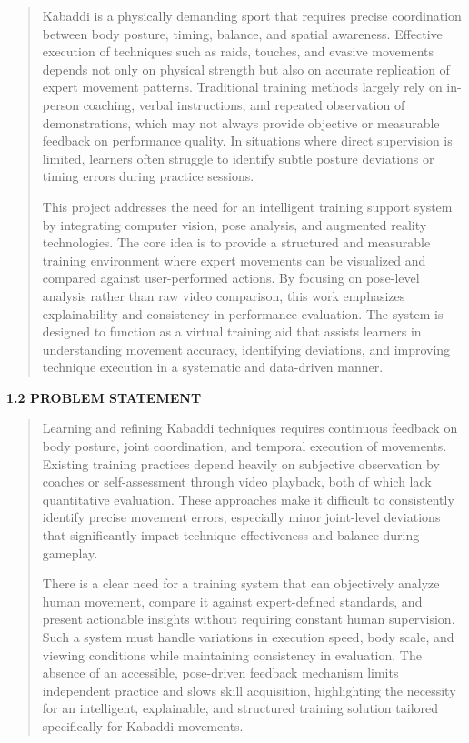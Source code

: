\documentclass[
]{article}
\begin{document}
\begin{quote}
Kabaddi is a physically demanding sport that requires precise
coordination between body posture, timing, balance, and spatial
awareness. Effective execution of techniques such as raids, touches, and
evasive movements depends not only on physical strength but also on
accurate replication of expert movement patterns. Traditional training
methods largely rely on in-person coaching, verbal instructions, and
repeated observation of demonstrations, which may not always provide
objective or measurable feedback on performance quality. In situations
where direct supervision is limited, learners often struggle to identify
subtle posture deviations or timing errors during practice sessions.

This project addresses the need for an intelligent training support
system by integrating computer vision, pose analysis, and augmented
reality technologies. The core idea is to provide a structured and
measurable training environment where expert movements can be visualized
and compared against user-performed actions. By focusing on pose-level
analysis rather than raw video comparison, this work emphasizes
explainability and consistency in performance evaluation. The system is
designed to function as a virtual training aid that assists learners in
understanding movement accuracy, identifying deviations, and improving
technique execution in a systematic and data-driven manner.
\end{quote}

\textbf{1.2 PROBLEM STATEMENT}

\begin{quote}
Learning and refining Kabaddi techniques requires continuous feedback on
body posture, joint coordination, and temporal execution of movements.
Existing training practices depend heavily on subjective observation by
coaches or self-assessment through video playback, both of which lack
quantitative evaluation. These approaches make it difficult to
consistently identify precise movement errors, especially minor
joint-level deviations that significantly impact technique effectiveness
and balance during gameplay.

There is a clear need for a training system that can objectively analyze
human movement, compare it against expert-defined standards, and present
actionable insights without requiring constant human supervision. Such a
system must handle variations in execution speed, body scale, and
viewing conditions while maintaining consistency in evaluation. The
absence of an accessible, pose-driven feedback mechanism limits
independent practice and slows skill acquisition, highlighting the
necessity for an intelligent, explainable, and structured training
solution tailored specifically for Kabaddi movements.
\end{quote}
\end{document}
